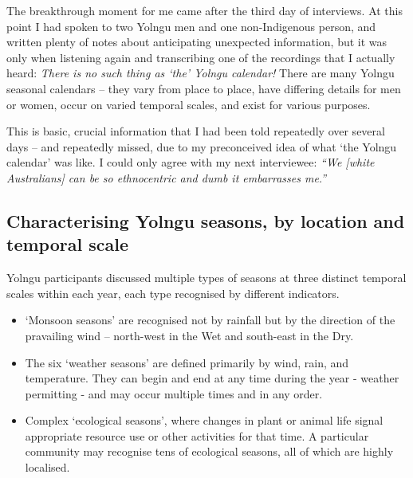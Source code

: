 The breakthrough moment for me came after the third day of interviews.
At this point I had spoken to two Yolngu men and one non-Indigenous
person, and written plenty of notes about anticipating unexpected
information, but it was only when listening again and transcribing
one of the recordings that I actually heard:  \emph{There is no such
thing as `the' Yolngu calendar!}  There are many Yolngu seasonal
calendars -- they vary from place to place, have differing details for
men or women, occur on varied temporal scales, and exist for various
purposes.

This is basic, crucial information that I had been told repeatedly over
several days -- and repeatedly missed, due to my preconceived idea of what
`the Yolngu calendar' was like.  I could only agree with my next interviewee:
\textsl{``We [white Australians] can be so ethnocentric and dumb it embarrasses me.''}



\subsection{Characterising Yolngu seasons, by location and temporal scale}
\label{subsec:three-seasons-scales}

Yolngu participants discussed multiple types of seasons at three distinct temporal scales
within each year, each type recognised by different indicators.
\begin{itemize}
\item `Monsoon seasons' are recognised not by rainfall but by the direction
        of the pravailing wind -- north-west in the Wet and south-east in the Dry.
\item The six `weather seasons' are defined primarily by wind, rain, and temperature.
        They can begin and end at any time during the year - weather permitting -
        and may occur multiple times and in any order.
\item Complex `ecological seasons', where changes in plant or animal life
        signal appropriate resource use or other activities for that time.
        A particular community may recognise tens of ecological seasons,
        all of which are highly localised.
\end{itemize}

